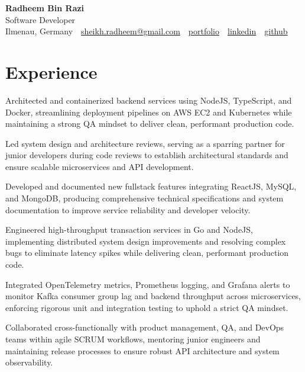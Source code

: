 \documentclass[10pt,a4paper]{resume}
\makeatletter
\newcommand{\Portfolio}{https://radheem.github.io/my-cv}
\newcommand{\PortfolioText}{portfolio}
\newcommand{\GitHub}{https://github.com/radheem}
\newcommand{\LinkedIn}{https://www.linkedin.com/in/radheem-razi}
\newcommand{\Email}{sheikh.radheem@gmail.com}
\makeatother
\begin{document}
\begin{center}
  {\huge\bfseries Radheem Bin Razi}\\[3pt]
  {\large Software Developer}\\[6pt]
  \small
  Ilmenau, Germany \,\textbar\,
  \href{mailto:\Email}{\Email} \,\textbar\,
  \href{\Portfolio}{\PortfolioText} \,\textbar\,
  \href{\LinkedIn}{linkedin} \,\textbar\,
  \href{\GitHub}{github}
\end{center}
\vspace{2pt}

\section{Experience}

\bullets
  \item Architected and containerized backend services using NodeJS, TypeScript, and Docker, streamlining deployment pipelines on AWS EC2 and Kubernetes while maintaining a strong QA mindset to deliver clean, performant production code.
  \item Led system design and architecture reviews, serving as a sparring partner for junior developers during code reviews to establish architectural standards and ensure scalable microservices and API development.
  \item Developed and documented new fullstack features integrating ReactJS, MySQL, and MongoDB, producing comprehensive technical specifications and system documentation to improve service reliability and developer velocity.
\bulletsend
\vspace{1.5pt}
\bullets
  \item Engineered high-throughput transaction services in Go and NodeJS, implementing distributed system design improvements and resolving complex bugs to eliminate latency spikes while delivering clean, performant production code.
  \item Integrated OpenTelemetry metrics, Prometheus logging, and Grafana alerts to monitor Kafka consumer group lag and backend throughput across microservices, enforcing rigorous unit and integration testing to uphold a strict QA mindset.
  \item Collaborated cross-functionally with product management, QA, and DevOps teams within agile SCRUM workflows, mentoring junior engineers and maintaining release processes to ensure robust API architecture and system observability.
\end{document}
